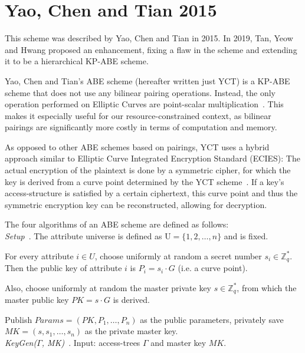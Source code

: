 \section{Yao, Chen and Tian 2015}

This scheme was described by Yao, Chen and Tian \cite{yao_lightweight_2015} in 2015.
In 2019, Tan, Yeow and Hwang \cite{tan_enhancement_2019} proposed an enhancement, fixing a flaw in the scheme and extending it to be a hierarchical KP-ABE scheme. %

Yao, Chen and Tian's ABE scheme (hereafter written just YCT) is a KP-ABE scheme that does not use any bilinear pairing operations.
Instead, the only operation performed on Elliptic Curves are point-scalar multiplication~\cite{yao_lightweight_2015}.
This makes it especially useful for our resource-constrained context, as bilinear pairings are significantly more costly in terms of computation and memory.

As opposed to other ABE schemes based on pairings, YCT uses a hybrid approach similar to Elliptic Curve Integrated Encryption Standard (ECIES):
The actual encryption of the plaintext is done by a symmetric cipher, for which the key is derived from a curve point determined by the YCT scheme~\cite{yao_lightweight_2015}.
If a key's \gls{access-structure} is satisfied by a certain ciphertext, this curve point and thus the symmetric encryption key can be reconstructed, allowing for decryption.~\cite{yao_lightweight_2015}

The four algorithms of an ABE scheme are defined as follows: \\

\emph{Setup}~\cite{yao_lightweight_2015}.
The attribute universe is defined as $\text{U} = \{1, 2, \dots, n\}$ and is fixed.

For every attribute $i \in U$, choose uniformly at random a secret number $s_i \in \mathbb{Z}_q^*$. %
Then the public key of attribute $i$ is $P_i = s_i \cdot G$ (i.e. a curve point).

Also, choose uniformly at random the master private key $s \in \mathbb{Z}_q^*$, from which the master public key $PK = s \cdot G$ is derived.

Publish $Params=(PK, P_1, \dots, P_n)$ as the public parameters, privately save $MK = (s, s_1, \dots, s_n)$ as the private master key.
\\

\emph{KeyGen($\Gamma$, MK)}~\cite{yao_lightweight_2015}.
Input: \glspl{access-tree} $\Gamma$ and master key $MK$.

